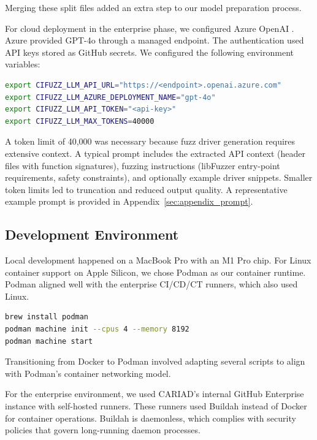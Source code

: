 Merging these split files added an extra step to our model preparation process.

For cloud deployment in the enterprise phase, we configured Azure OpenAI \cite{azure_openai}. Azure provided GPT-4o through a managed endpoint. The authentication used API keys stored as GitHub secrets. We configured the following environment variables:

\begin{lstlisting}[language=bash, caption={Azure OpenAI Configuration}]
export CIFUZZ_LLM_API_URL="https://<endpoint>.openai.azure.com"
export CIFUZZ_LLM_AZURE_DEPLOYMENT_NAME="gpt-4o"
export CIFUZZ_LLM_API_TOKEN="<api-key>"
export CIFUZZ_LLM_MAX_TOKENS=40000
\end{lstlisting}

A token limit of 40,000 was necessary because fuzz driver generation requires extensive context. A typical prompt includes the extracted API context (header files with function signatures), fuzzing instructions (libFuzzer entry-point requirements, safety constraints), and optionally example driver snippets. Smaller token limits led to truncation and reduced output quality. A representative example prompt is provided in Appendix~\ref{sec:appendix_prompt}.

\subsection{Development Environment}

Local development happened on a MacBook Pro with an M1 Pro chip. For Linux container support on Apple Silicon, we chose Podman as our container runtime. Podman aligned well with the enterprise CI/CD/CT runners, which also used Linux.

\begin{lstlisting}[language=bash, caption={Podman Setup on macOS}]
brew install podman
podman machine init --cpus 4 --memory 8192
podman machine start
\end{lstlisting}

Transitioning from Docker to Podman involved adapting several scripts to align with Podman's container networking model.

For the enterprise environment, we used CARIAD's internal GitHub Enterprise instance with self-hosted runners. These runners used Buildah \cite{buildah} instead of Docker for container operations. Buildah is daemonless, which complies with security policies that govern long-running daemon processes.

